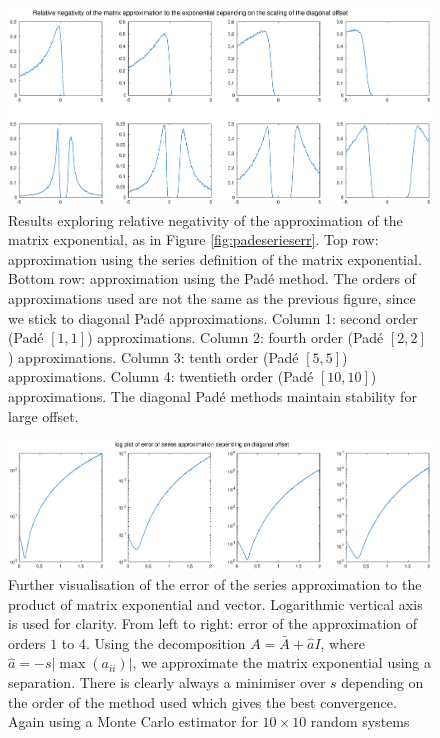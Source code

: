 \begin{figure}
    \centering
    \includegraphics[width=\linewidth]{Matlab/padevsseriesneg.eps}
    \caption{
        Results exploring relative negativity of the approximation of the matrix exponential, as in Figure \ref{fig:padeserieserr}.
        Top row: approximation using the series definition of the matrix exponential.
        Bottom row: approximation using the Pad\'e method.
        The orders of approximations used are not the same as the previous figure, since we stick to diagonal Pad\'e approximations.
        Column 1: second order (Pad\'e $[1,1]$) approximations.
        Column 2: fourth order (Pad\'e $[2,2]$) approximations.
        Column 3: tenth order (Pad\'e $[5,5]$) approximations.
        Column 4: twentieth order (Pad\'e $[10,10]$) approximations.
        The diagonal Pad\'e methods maintain stability for large offset.
    }
    \label{fig:padeseriesneg}
\end{figure}

\begin{figure}
    \centering
    \includegraphics[width=\linewidth]{Matlab/seriesexpminimiser.eps}
    \caption{
        Further visualisation of the error of the series approximation to the product of matrix exponential and vector.
        Logarithmic vertical axis is used for clarity.
        From left to right: error of the approximation of orders $1$ to $4$.
        Using the decomposition $A = \bar{A} + \hat{a}I$, where $\hat{a}= -s |\max(a_{ii})|$, we approximate the matrix exponential using a separation.
        There is clearly always a minimiser over $s$ depending on the order of the method used which gives the best convergence.
        Again using a Monte Carlo estimator for $10 \times 10$ random systems
    }
    \label{fig:serieslog}
\end{figure}

